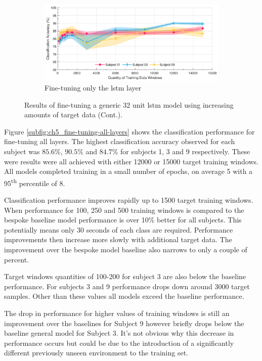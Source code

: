 \begin{figure}[t]\ContinuedFloat
    \begin{subfigure}{\textwidth}
        \centering
        \includegraphics[width=\textwidth]{content/5-Personalisation/ch5_frozen_dense_layer_accuracy.pdf}
        \caption{Fine-tuning only the \acrshort{lstm} layer}
    \end{subfigure}
    \caption[]{Results of fine-tuning a generic 32 unit \acrshort{lstm} model using increasing amounts of target data (Cont.).}
\end{figure}

Figure \ref{subfig:ch5_fine-tuning-all-layers} shows the classification performance for fine-tuning all layers. The highest classification accuracy observed for each subject was $85.6\%$, $90.5\%$ and $84.7\%$ for subjects 1, 3 and 9 respectively. These were results were all achieved with either 12000 or 15000 target training windows. All models completed training in a small number of epochs, on average 5 with a 95\textsuperscript{th} percentile of 8.

Classification performance improves rapidly up to 1500 target training windows. When performance for 100, 250 and 500 training windows is compared to the bespoke baseline model performance is over 10\% better for all subjects. This potentially means only 30 seconds of each class are required. Performance improvements then increase more slowly with additional target data. The improvement over the bespoke model baseline also narrows to only a couple of percent.

Target windows quantities of 100-200 for subject 3 are also below the baseline performance. For subjects 3 and 9 performance drops down around 3000 target samples.  Other than these values all models exceed the baseline performance.

The drop in performance for higher values of training windows is still an improvement over the baselines for Subject 9 however briefly drops below the baseline general model for Subject 3. It's not obvious why this decrease in performance occurs but could be due to the introduction of a significantly different previously unseen environment to the training set.

